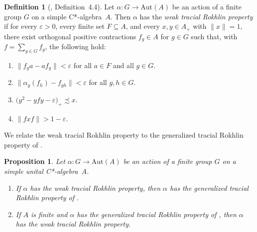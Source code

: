 \documentclass[11pt]{amsart}
\theoremstyle{plain}
\newtheorem{proposition}[theorem]{Proposition}
\theoremstyle{definition}
\newtheorem{definition}[theorem]{Definition}
\theoremstyle{remark}
\numberwithin{equation}{section}
\begin{document}
\begin{definition}[\cite{FG17}, Definition~4.4]\label{defwtrp}
Let $\alpha \colon G \to \mathrm{Aut} (A)$
be an action of a finite group $G$ on a simple C*-algebra~$A$.
Then $\alpha$ has the {\emph{weak tracial Rokhlin property}} if
for every $\varepsilon > 0$,
every finite set $F \subseteq A$,
and every $x, y \in A_{+}$ with $\| x \| = 1$,
there exist orthogonal positive contractions
$f_g \in A$ for $g \in G$ such that,
with $f = \sum_{g \in G} f_{g}$,
the following hold:
%
\begin{enumerate}
\item\label{WTRP-COM}
$\| f_{g} a - a f_{g} \| < \varepsilon$
for all $a \in F$ and all $g \in G$.
\item\label{WTRP-LTR}
$\|\alpha_{g} (f_{h}) - f_{g h} \| < \varepsilon$ for all $g, h \in G$.
\item\label{WTRP-CU-EQ}
$\big( y^{2} - y f y - \varepsilon \big)_{+} \precsim x$.
\item\label{WTRP-OUT-CO}
$\|f x f\| > 1 - \varepsilon$.
\end{enumerate}
%
\end{definition}

We relate the weak tracial Rokhlin property
to the generalized tracial Rokhlin property
of \cite{HO13}.

\begin{proposition}\label{P_8615_WeakToGen}
Let $\alpha \colon G \to \mathrm{Aut} (A)$
be an action of a finite group $G$
on a simple unital C*-algebra~$A$.
%
\begin{enumerate}[label=$\mathrm{(\arabic*)}$]
%
\item\label{P_8615_WeakToGen_ToGen}
If $\alpha$ has the weak tracial Rokhlin property,
then $\alpha$ has the generalized tracial Rokhlin property
of \cite[Definition 5.2]{HO13}.
%
\item\label{P_8615_WeakToGen_ToWk}
If $A$ is finite
and $\alpha$ has the generalized tracial Rokhlin property
of \cite[Definition 5.2]{HO13},
then $\alpha$ has the weak tracial Rokhlin property.
\end{enumerate}
%
\end{proposition}

\end{document}
